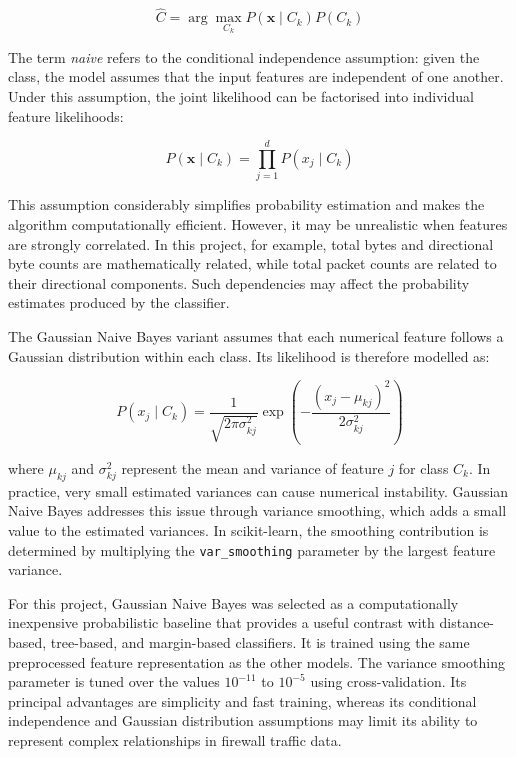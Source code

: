 \begin{equation}
\hat{C} =
\arg\max_{C_k}
P(\mathbf{x}\mid C_k)P(C_k)
\label{eq:naive_bayes_decision}
\end{equation}

The term \emph{naive} refers to the conditional independence assumption: given the class, the model assumes that the input features are independent of one another. Under this assumption, the joint likelihood can be factorised into individual feature likelihoods:

\begin{equation}
P(\mathbf{x}\mid C_k) =
\prod_{j=1}^{d} P(x_j\mid C_k)
\label{eq:naive_bayes_independence}
\end{equation}

This assumption considerably simplifies probability estimation and makes the algorithm computationally efficient. However, it may be unrealistic when features are strongly correlated. In this project, for example, total bytes and directional byte counts are mathematically related, while total packet counts are related to their directional components. Such dependencies may affect the probability estimates produced by the classifier.

The Gaussian Naive Bayes variant assumes that each numerical feature follows a Gaussian distribution within each class. Its likelihood is therefore modelled as:

\begin{equation}
P(x_j\mid C_k) =
\frac{1}{\sqrt{2\pi\sigma_{kj}^{2}}}
\exp\left(
-\frac{(x_j-\mu_{kj})^2}{2\sigma_{kj}^{2}}
\right)
\label{eq:gaussian_likelihood}
\end{equation}

where $\mu_{kj}$ and $\sigma_{kj}^{2}$ represent the mean and variance of feature $j$ for class $C_k$. In practice, very small estimated variances can cause numerical instability. Gaussian Naive Bayes addresses this issue through variance smoothing, which adds a small value to the estimated variances. In scikit-learn, the smoothing contribution is determined by multiplying the \texttt{var\_smoothing} parameter by the largest feature variance.

For this project, Gaussian Naive Bayes was selected as a computationally inexpensive probabilistic baseline that provides a useful contrast with distance-based, tree-based, and margin-based classifiers. It is trained using the same preprocessed feature representation as the other models. The variance smoothing parameter is tuned over the values $10^{-11}$ to $10^{-5}$ using cross-validation. Its principal advantages are simplicity and fast training, whereas its conditional independence and Gaussian distribution assumptions may limit its ability to represent complex relationships in firewall traffic data.

